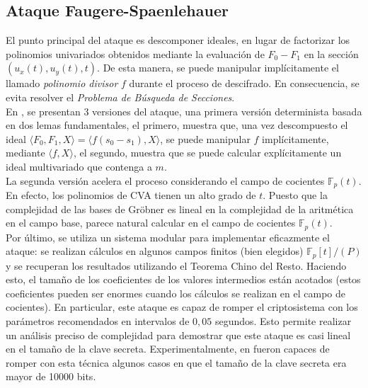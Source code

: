 \documentclass[11pt]{article}
\newcommand{\Fp}{\mathbb{F}_p}
\numberwithin{equation}{section} %
\numberwithin{figure}{section} %
\numberwithin{table}{section} %
\begin{document}
		\subsection{Ataque Faugere-Spaenlehauer}
		\label{42FS}

			El punto principal del ataque es descomponer ideales, en lugar de factorizar los polinomios univariados obtenidos mediante la evaluaci\'on de $F_0-F_1$ en la secci\'on $(u_x(t), u_y(t),t)$. De esta manera, se puede manipular impl\'icitamente el llamado \textit{polinomio divisor} $f$ durante el proceso de descifrado. En consecuencia, se evita resolver el \textit{Problema de B\'usqueda de Secciones}.\\

			En \cite{FS}, se presentan 3 versiones del ataque, una primera versi\'on determinista basada en dos lemas fundamentales, el primero, muestra que, una vez descompuesto el ideal $\langle F_0,F_1,X\rangle=\langle f(s_0-s_1),X\rangle$, se puede manipular $f$ impl\'icitamente, mediante $\langle f,X\rangle$, el segundo, muestra que se puede calcular expl\'icitamente un ideal multivariado que contenga a $m$.\\

			La segunda versi\'on acelera el proceso considerando el campo de cocientes $\Fp(t)$. En efecto, los polinomios de CVA tienen un alto grado de $t$. Puesto que la complejidad de las bases de Gröbner es lineal en la complejidad de la aritm\'etica en el campo base, parece natural calcular en el campo de cocientes $\Fp (t)$.\\

			Por \'ultimo, se utiliza un sistema modular para implementar eficazmente el ataque: se realizan c\'alculos en algunos campos finitos (bien elegidos) $\Fp [t] / (P)$ y se recuperan los resultados utilizando el Teorema Chino del Resto. Haciendo esto, el tamaño de los coeficientes de los valores intermedios est\'an acotados (estos coeficientes pueden ser enormes cuando los c\'alculos se realizan en el campo de cocientes). En particular, este ataque es capaz de romper el criptosistema con los par\'ametros recomendados en intervalos de $0,05$ segundos. Esto permite realizar un an\'alisis preciso de complejidad para demostrar que este ataque es casi lineal en el tamaño de la clave secreta. Experimentalmente, en \cite{FS} fueron capaces de romper con esta t\'ecnica algunos casos en que el tamaño de la clave secreta era mayor de 10000 bits.
\end{document}
